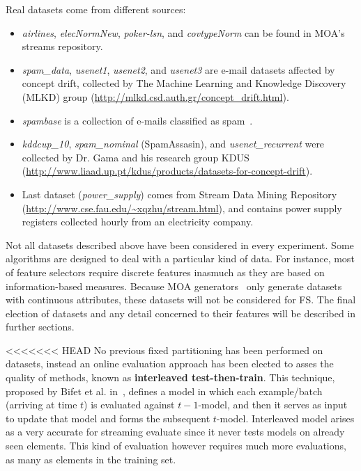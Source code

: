 \documentclass[preprint,12pt]{elsarticle}
\begin{document}
\begin{itemize}
Real datasets come from different sources:

\begin{itemize}
	\item \textit{airlines}, \textit{elecNormNew}, \textit{poker-lsn}, and \textit{covtypeNorm} can be found in MOA's streams repository.
	\item \textit{spam\_data}, \textit{usenet1}, \textit{usenet2}, and \textit{usenet3} are e-mail datasets affected by concept drift, collected by The Machine Learning and Knowledge Discovery (MLKD) group (\url{http://mlkd.csd.auth.gr/concept_drift.html}).
	\item \textit{spambase} is a collection of e-mails classified as spam~\cite{bache13}. 
	\item \textit{kddcup\_10}, \textit{spam\_nominal} (SpamAssasin), and \textit{usenet\_recurrent} were collected by Dr. Gama and his research group KDUS (\url{http://www.liaad.up.pt/kdus/products/datasets-for-concept-drift}). 
	\item Last dataset (\textit{power\_supply}) comes from Stream Data Mining Repository (\url{http://www.cse.fau.edu/~xqzhu/stream.html}), and contains power supply registers collected hourly from an electricity company.
\end{itemize}
 
Not all datasets described above have been considered in every experiment. Some algorithms are designed to deal with a particular kind of data. For instance, most of feature selectors require discrete features inasmuch as they are based on information-based measures. Because MOA generators~\cite{bifet10} only generate datasets with continuous attributes, these datasets will not be considered for FS. The final election of datasets and any detail concerned to their features will be described in further sections.

<<<<<<< HEAD
No previous fixed partitioning has been performed on datasets, instead an online evaluation approach has been elected to asses the quality of methods, known as \textbf{interleaved test-then-train}. This technique, proposed by Bifet et al. in~\cite{bifet09}, defines a model in which each example/batch (arriving at time $t$) is evaluated against $t-1$-model, and then it serves as input to update that model and forms the subsequent $t$-model. Interleaved model arises as a very accurate for streaming evaluate since it never tests models on already seen elements. This kind of evaluation however requires much more evaluations, as many as elements in the training set.


\end{itemize}
\end{document}
